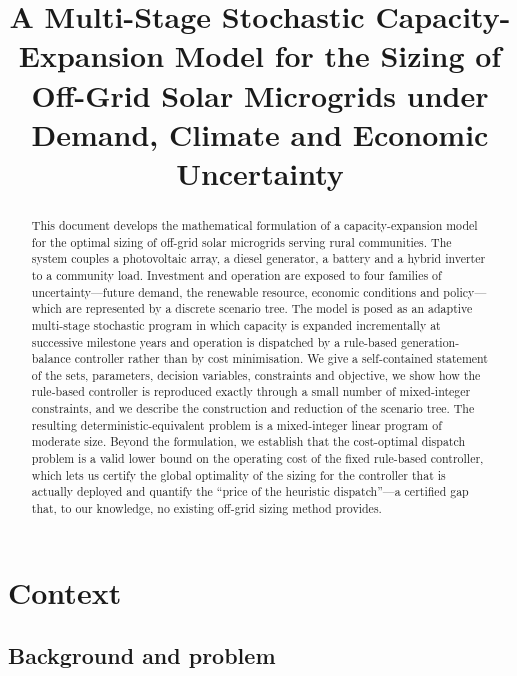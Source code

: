 \documentclass[11pt,a4paper]{article}
\title{A Multi-Stage Stochastic Capacity-Expansion Model for the Sizing of
Off-Grid Solar Microgrids under Demand, Climate and Economic Uncertainty}
\author{}
\date{}
\theoremstyle{plain}
\theoremstyle{definition}
\begin{document}
\maketitle

\begin{abstract}
This document develops the mathematical formulation of a capacity-expansion model
for the optimal sizing of off-grid solar microgrids serving rural communities. The
system couples a photovoltaic array, a diesel generator, a
battery and a hybrid inverter to a community load. Investment and operation are
exposed to four families of uncertainty---future demand, the renewable resource,
economic conditions and policy---which are represented by a discrete scenario tree.
The model is posed as an adaptive multi-stage stochastic program in which capacity is
expanded incrementally at successive milestone years and operation is dispatched by a
rule-based generation-balance controller rather than by cost minimisation. We give a
self-contained statement of the sets, parameters, decision variables, constraints and
objective, we show how the rule-based controller is reproduced exactly through a small
number of mixed-integer constraints, and we describe the construction and reduction of
the scenario tree. The resulting deterministic-equivalent problem is a mixed-integer
linear program of moderate size. Beyond the formulation, we establish that the
cost-optimal dispatch problem is a valid lower bound on the operating cost of the fixed
rule-based controller, which lets us certify the global optimality of the sizing for the
controller that is actually deployed and quantify the ``price of the heuristic
dispatch''---a certified gap that, to our knowledge, no existing off-grid sizing method
provides.
\end{abstract}

\tableofcontents

\section{Context}
\label{sec:intro}

\subsection{Background and problem}
\end{document}
